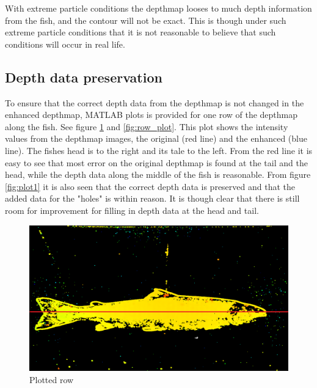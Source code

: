 With extreme particle conditions the depthmap looses to much depth information from the fish, and the contour will not be exact. This is though under such extreme particle conditions that it is not reasonable to believe that such conditions will occur in real life.


\subsection{Depth data preservation}

To ensure that the correct depth data from the depthmap is not changed in the enhanced depthmap, MATLAB plots is provided for one row of the depthmap along the fish. See figure \ref{fig:sectional} and \ref{fig:row_plot}. This plot shows the intensity values from the depthmap images, the original (red line) and the enhanced (blue line). The fishes head is to the right and its tale to the left. From the red line it is easy to see that most error on the original depthmap is found at the tail and the head, while the depth data along the middle of the fish is reasonable. From figure \ref{fig:plot1} it is also seen that the correct depth data is preserved and that the added data for the "holes" is within reason. It is though clear that there is still room for improvement for filling in depth data at the head and tail. 

\begin{figure}[h]
    \centering
    \includegraphics[width=.7\linewidth]{images/results/sectional}
    \caption{Plotted row}
    \label{fig:sectional}
\end{figure}


